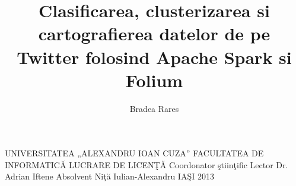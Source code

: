 \documentclass[10pt,a4paper]{article}
\author{Bradea Rares}
\title{Clasificarea, clusterizarea si cartografierea datelor de pe Twitter folosind Apache Spark si Folium}
\begin{document}
	UNIVERSITATEA „ALEXANDRU IOAN CUZA”
	FACULTATEA DE INFORMATICĂ
	LUCRARE DE LICENŢĂ
	Coordonator ştiinţific
	Lector Dr. Adrian Iftene
	Absolvent
	Niţă Iulian-Alexandru
	IAŞI
	2013
\end{document}
